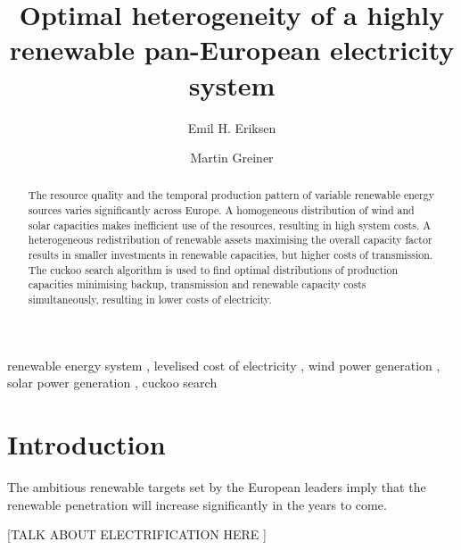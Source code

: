 \documentclass[a4paper, 5p, sort&compress]{elsarticle}%
\begin{document}
\begin{frontmatter}

\title{Optimal heterogeneity of a highly renewable pan-European electricity system}

\author[label1]{Emil H. Eriksen}
\author[label2,label3]{Martin Greiner}
\address[label1]{Department of Physics and Astronomy, Aarhus University, 8000 Aarhus C,  Denmark}
\address[label2]{Department of Mathematics, Aarhus University, 8000 Aarhus C,  Denmark}
\address[label3]{Department of Engineering, Aarhus University, 8200 Aarhus,  Denmark}


\begin{abstract}
  The resource quality and the temporal production pattern of variable
  renewable energy sources varies significantly across Europe. A
  homogeneous distribution of wind and solar capacities makes
  inefficient use of the resources, resulting in high system costs. A
  heterogeneous redistribution of renewable assets maximising the
  overall capacity factor results in smaller investments in renewable
  capacities, but higher costs of transmission. The cuckoo search
  algorithm is used to find optimal distributions of production
  capacities minimising backup, transmission and renewable capacity
  costs simultaneously, resulting in lower costs of electricity.
\end{abstract}

\begin{keyword}
renewable energy system \sep 
levelised cost of electricity \sep
wind power generation \sep
solar power generation \sep
cuckoo search 
\end{keyword}

\end{frontmatter}


\section{Introduction}
\label{sec:one}

The ambitious renewable targets set by the European leaders\cite{eu2050} imply
that the renewable penetration will increase significantly in the
years to come. 

[TALK ABOUT ELECTRIFICATION HERE \cite{Williams12,ecf2050}]
\end{document}

